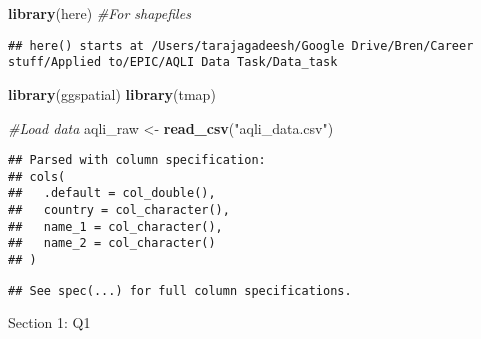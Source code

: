 \documentclass[]{article}
\newenvironment{Shaded}{\begin{snugshade}}{\end{snugshade}}
\newcommand{\CommentTok}[1]{\textcolor[rgb]{0.56,0.35,0.01}{\textit{#1}}}
\newcommand{\KeywordTok}[1]{\textcolor[rgb]{0.13,0.29,0.53}{\textbf{#1}}}
\newcommand{\NormalTok}[1]{#1}
\newcommand{\StringTok}[1]{\textcolor[rgb]{0.31,0.60,0.02}{#1}}
\begin{document}
\begin{Shaded}
\begin{Highlighting}[]
\KeywordTok{library}\NormalTok{(here) }\CommentTok{#For shapefiles}
\end{Highlighting}
\end{Shaded}

\begin{verbatim}
## here() starts at /Users/tarajagadeesh/Google Drive/Bren/Career stuff/Applied to/EPIC/AQLI Data Task/Data_task
\end{verbatim}

\begin{Shaded}
\begin{Highlighting}[]
\KeywordTok{library}\NormalTok{(ggspatial)}
\KeywordTok{library}\NormalTok{(tmap)}

\CommentTok{#Load data}
\NormalTok{aqli_raw <-}\StringTok{ }\KeywordTok{read_csv}\NormalTok{(}\StringTok{"aqli_data.csv"}\NormalTok{) }
\end{Highlighting}
\end{Shaded}

\begin{verbatim}
## Parsed with column specification:
## cols(
##   .default = col_double(),
##   country = col_character(),
##   name_1 = col_character(),
##   name_2 = col_character()
## )
\end{verbatim}

\begin{verbatim}
## See spec(...) for full column specifications.
\end{verbatim}

Section 1: Q1
\end{document}
